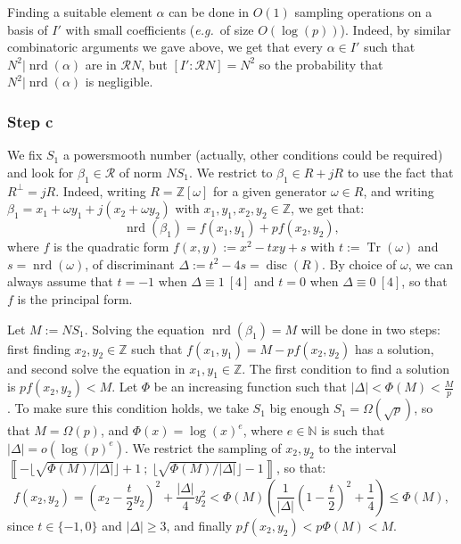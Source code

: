 \documentclass[a4paper,10pt]{report}
\theoremstyle{definition}
\theoremstyle{plain}
\theoremstyle{definition}
\newcommand{\eg}{\emph{e.g.}\ }
\newcommand{\N}{\mathbb{N}}
\newcommand{\Z}{\mathbb{Z}}
\newcommand{\m}[1]{\mathcal{#1}}
\renewcommand{\i}[2]{\left\llbracket #1~;~#2\right\rrbracket}
\renewcommand{\(}{\left(}
\renewcommand{\)}{\right)}
\DeclareMathOperator{\Tr}{Tr}
\DeclareMathOperator{\disc}{disc}
\DeclareMathOperator{\nrd}{nrd}
\begin{document}
Finding a suitable element $\alpha$ can be done in $O(1)$ sampling operations on a basis of $I'$ with small coefficients (\eg of size $O(\log(p))$).  Indeed, by similar combinatoric arguments we gave above, we get that every $\alpha\in I'$ such that $N^2|\nrd(\alpha)$ are in $\m{R}N$, but $[I':\m{R}N]=N^2$ so the probability that $N^2|\nrd(\alpha)$ is negligible.

\subsubsection{Step c}

We fix $S_1$ a powersmooth number (actually,  other conditions could be required) and look for $\beta_1\in\m{R}$ of norm $NS_1$. We restrict to $\beta_1\in R+jR$ to use the fact that $R^\bot=jR$.  Indeed, writing $R=\Z[\omega]$ for a given generator $\omega\in R$, and writing $\beta_1=x_1+\omega y_1+j(x_2+\omega y_2)$ with $x_1, y_1, x_2, y_2\in\Z$, we get that:
\[\nrd(\beta_1)=f(x_1,y_1)+pf(x_2,y_2),\]
where $f$ is the quadratic form $f(x,y):=x^2-t xy+s$ with $t:=\Tr(\omega)$ and $s=\nrd(\omega)$, of discriminant $\Delta:=t^2-4s=\disc(R)$.  By choice of $\omega$, we can always assume that $t=-1$ when $\Delta\equiv 1 \ [4]$ and $t=0$ when $\Delta\equiv 0 \ [4]$, so that $f$ is the principal form.  

Let $M:=NS_1$. Solving the equation $\nrd(\beta_1)=M$ will be done in two steps: first finding $x_2,y_2\in\Z$ such that $f(x_1,y_1)=M-pf(x_2,y_2)$ has a solution, and second solve the equation in $x_1,y_1\in\Z$.  The first condition to find a solution is $pf(x_2,y_2)<M$. Let $\Phi$ be an increasing function such that $|\Delta|<\Phi(M)<\frac{M}{p}$. To make sure this condition holds, we take $S_1$ big enough $S_1=\Omega(\sqrt{p})$, so that $M=\Omega(p)$, and $\Phi(x)=\log(x)^e$, where $e\in\N$ is such that $|\Delta|=o(\log(p)^e)$.  We restrict the sampling of $x_2, y_2$ to the interval $\i{-\lfloor\sqrt{\Phi(M)/|\Delta|}\rfloor+1}{\lfloor\sqrt{\Phi(M)/|\Delta|}\rfloor-1}$, so that:
\[f(x_2,y_2)=\(x_2-\frac{t}{2}y_2\)^2+\frac{|\Delta|}{4}y_2^2<\Phi(M)\(\frac{1}{|\Delta|}\(1-\frac{t}{2}\)^2+\frac{1}{4}\)\leq \Phi(M),\]
since $t\in\{-1,0\}$ and $|\Delta|\geq 3$, and finally $pf(x_2,y_2)<p\Phi(M)<M$. 
\end{document}
